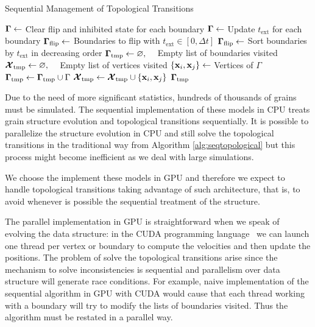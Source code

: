 \begin{algorithm}
\caption{Sequential Management of Topological Transitions}
\label{alg:seqtopological}
\begin{algorithmic}[1]
\State $\bm{\Gamma} \gets$ Clear flip and inhibited state for each boundary
\State $\bm{\Gamma} \gets$ Update $t_{\text{ext}}$ for each boundary
\State $\bm{\Gamma}_{\text{flip}} \gets$ Boundaries to flip with $t_{\text{ext}} \in [0, \Delta t]$ 
\State $\bm{\Gamma}_{\text{flip}} \gets$ Sort boundaries by $t_{\text{ext}}$ in decreasing order
\State $\bm{\Gamma}_{\text{tmp}} \gets \varnothing,\quad$ Empty list of boundaries visited
\State $\bm{\mathcal{X}}_{\text{tmp}} \gets \varnothing,\quad$ Empty list of vertices visited
    \State $\{\x_i, \x_j\} \gets $ Vertices of $\Gamma$
        \State $\bm{\Gamma}_{\text{tmp}} \gets \bm{\Gamma}_{\text{tmp}} \cup \Gamma$
        \State $\vertices_{\text{tmp}} \gets \vertices_{\text{tmp}} \cup \{\x_i, \x_j\}$
    \Else
        \State \Return $\bm{\Gamma}_{\text{tmp}}$
    \EndIf
\EndFor
\EndProcedure
\end{algorithmic}
\end{algorithm}

Due to the need of more significant statistics, hundreds of thousands of grains must be simulated. The sequential implementation of these models in CPU treats grain structure evolution and topological transitions sequentially. It is possible to parallelize the structure evolution in CPU and still solve the topological transitions in the traditional way from Algorithm \ref{alg:seqtopological} but this process might become inefficient as we deal with large simulations.

We choose the implement these models in GPU and therefore we expect to handle topological transitions taking advantage of such architecture, that is, to avoid whenever is possible the sequential treatment of the structure. 

The parallel implementation in GPU is straightforward when we speak of evolving the data structure: in the CUDA programming language~\cite{Nickolls:2008:SPP:1365490.1365500, nvidiacuda} we can launch one thread per vertex or boundary to compute the velocities and then update the positions. The problem of solve the topological transitions arise since the mechanism to solve inconsistencies is sequential and parallelism over data structure will generate race conditions. For example, naive implementation of the sequential algorithm in GPU with CUDA would cause that each thread working with a boundary will try to modify the lists of boundaries visited. 
Thus the algorithm must be restated in a parallel way.

